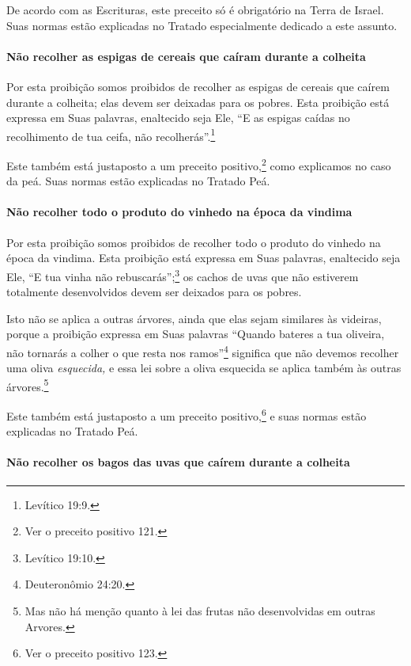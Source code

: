 \begin{multicols}{2}
De acordo com as Escrituras, este preceito só é obrigatório na Terra de
Israel. Suas normas estão explicadas no Tratado especialmente dedicado a
este assunto.

\paragraph{Não recolher as espigas de cereais que caíram durante a colheita}

Por esta proibição somos proibidos de recolher as espigas de cereais que
caírem durante a colheita; elas devem ser deixadas para os pobres. Esta
proibição está expressa em Suas palavras, enaltecido seja Ele, ``E as
espigas caídas no recolhimento de tua ceifa, não recolherás''.\footnote{Levítico
19:9.}

Este também está justaposto a um preceito
positivo,\footnote{Ver o preceito positivo 121.} como explicamos no caso da peá\starr. Suas normas estão explicadas no Tratado Peá\starr.

\paragraph{Não recolher todo o produto do vinhedo na época da vindima}

Por esta proibição somos proibidos de recolher todo o produto do vinhedo
na época da vindima. Esta proibição está expressa em Suas palavras,
enaltecido seja Ele, ``E tua vinha não rebuscarás'';\footnote{Levítico 19:10.} os
cachos de uvas que não estiverem totalmente desenvolvidos devem ser
deixados para os pobres.

Isto não se aplica a outras árvores, ainda que elas sejam similares às
videiras, porque a proibição expressa em Suas palavras ``Quando bateres
a tua oliveira, não tornarás a colher o que resta nos ramos''\footnote{Deuteronômio 24:20.} significa que não devemos recolher uma oliva
\emph{esquecida,} e essa lei sobre a oliva esquecida se aplica também
às outras árvores.\footnote{Mas não há menção quanto à lei das frutas não desenvolvidas em outras Arvores.}

Este também está justaposto a um preceito
positivo,\footnote{Ver o preceito positivo 123.} e suas normas estão explicadas no
Tratado Peá\starr.

\paragraph{Não recolher os bagos das uvas que caírem durante a colheita}


\end{multicols}
